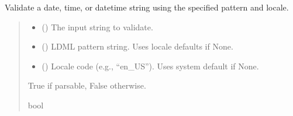 \documentclass[letterpaper,10pt,english]{sphinxmanual}
\begin{document}
\begin{fulllineitems}
\begin{fulllineitems}
\label{\detokenize{apache_commons_validator_python.routines:apache_commons_validator_python.routines.abstract_calendar_validator.AbstractCalendarValidator.is_valid}}
\pysigstartsignatures
{}
\pysigstopsignatures
\sphinxAtStartPar
Validate a date, time, or datetime string using the specified pattern and locale.
\begin{quote}\begin{description}
\begin{itemize}
\item {} 
\sphinxAtStartPar
{} () \textendash{} The input string to validate.

\item {} 
\sphinxAtStartPar
{} () \textendash{} LDML pattern string. Uses locale defaults if None.

\item {} 
\sphinxAtStartPar
{} () \textendash{} Locale code (e.g., “en\_US”). Uses system default if None.

\end{itemize}

\sphinxAtStartPar
True if parsable, False otherwise.

\sphinxAtStartPar
bool

\end{description}\end{quote}

\end{fulllineitems}



\end{fulllineitems}
\end{document}

